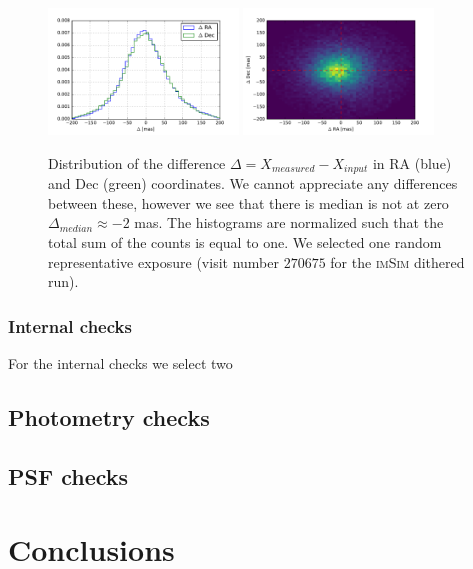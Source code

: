 \documentclass[\docopts]{\docclass}
\begin{document}
\begin{figure}
  \centering
  \includegraphics[width=0.45\textwidth]{astrometry_single_visit_imsim_dithered_hist}
  \includegraphics[width=0.45\textwidth]{astrometry_single_visit_imsim_dithered_hist2d}
  \caption{Distribution of the difference $\Delta=X_{measured}-X_{input}$ in RA (blue) and Dec (green) coordinates. We cannot
  appreciate any differences between these, however we see that there is median is not at zero $\Delta_{median} \approx -2$ mas.
  The histograms are normalized such that the total sum of the counts is equal to one. We selected one random representative
  exposure (visit number $270675$ for the \textsc{imSim} dithered run).}
  \label{fig:astrometry_a}
\end{figure}
\subsubsection{Internal checks}
\label{sec:internal_astrometry}

For the internal checks we select two
\subsection{Photometry checks}
\label{sec:photometry_checks}

\subsection{PSF checks}
\label{sec:psf_checks}


\section{Conclusions}
\label{sec:conclusions}
\end{document}
